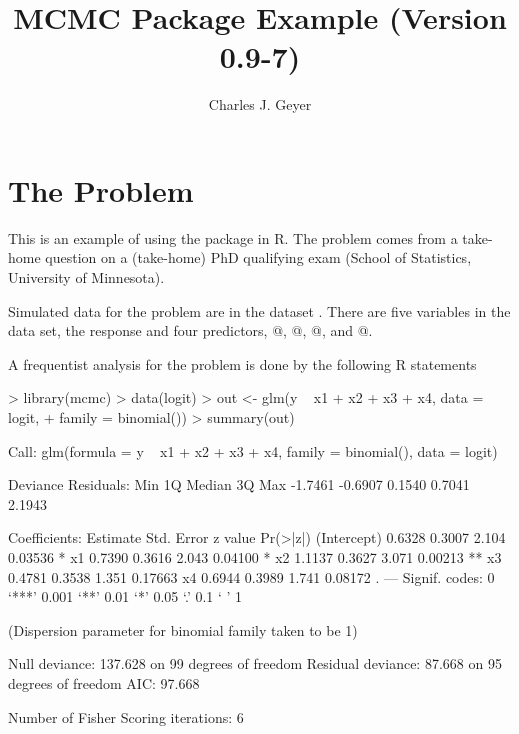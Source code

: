 \documentclass{article}
\begin{document}



\title{MCMC Package Example (Version 0.9-7)}
\author{Charles J. Geyer}
\maketitle

\section{The Problem}

This is an example of using the \verb@mcmc@ package in R.  The problem comes
from a take-home question on a (take-home) PhD qualifying exam
(School of Statistics, University of Minnesota).

Simulated data for the problem are in the dataset \verb@logit@.
There are five variables in the data set, the response \verb@y@
and four predictors, @, @, @, and @.

A frequentist analysis for the problem is done by the following R statements
\begin{Schunk}
\begin{Sinput}
> library(mcmc)
> data(logit)
> out <- glm(y ~ x1 + x2 + x3 + x4, data = logit,
+     family = binomial())
> summary(out)
\end{Sinput}
\begin{Soutput}
Call:
glm(formula = y ~ x1 + x2 + x3 + x4, family = binomial(), data = logit)

Deviance Residuals: 
    Min       1Q   Median       3Q      Max  
-1.7461  -0.6907   0.1540   0.7041   2.1943  

Coefficients:
            Estimate Std. Error z value Pr(>|z|)   
(Intercept)   0.6328     0.3007   2.104  0.03536 * 
x1            0.7390     0.3616   2.043  0.04100 * 
x2            1.1137     0.3627   3.071  0.00213 **
x3            0.4781     0.3538   1.351  0.17663   
x4            0.6944     0.3989   1.741  0.08172 . 
---
Signif. codes:  
0 ‘***’ 0.001 ‘**’ 0.01 ‘*’ 0.05 ‘.’ 0.1 ‘ ’ 1

(Dispersion parameter for binomial family taken to be 1)

    Null deviance: 137.628  on 99  degrees of freedom
Residual deviance:  87.668  on 95  degrees of freedom
AIC: 97.668

Number of Fisher Scoring iterations: 6
\end{Soutput}
\end{Schunk}
\end{document}

